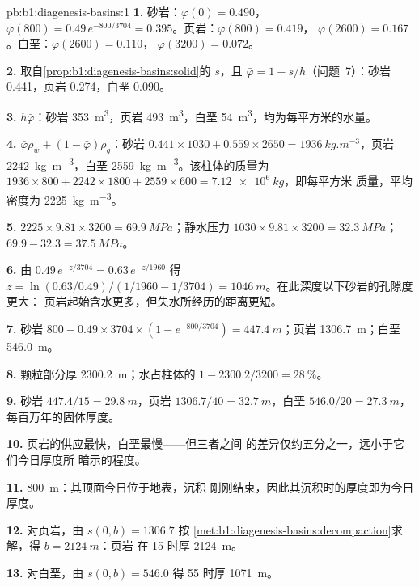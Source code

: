 \begin{solution}{pb:b1:diagenesis-basins:1}
\textbf{1.} 砂岩：$\varphi(0) = \num{0.490}$，$\varphi(800) =
0.49\,e^{-800/3704} = \num{0.395}$。页岩：$\varphi(800) = \num{0.419}$，
$\varphi(2600) = \num{0.167}$。白垩：$\varphi(2600) = \num{0.110}$，
$\varphi(3200) = \num{0.072}$。

\textbf{2.} 取自\cref{prop:b1:diagenesis-basins:solid}的 $s$，且 $\bar\varphi
= 1 - s/h$（问题~7）：砂岩 \num{0.441}，页岩 \num{0.274}，白垩
\num{0.090}。

\textbf{3.} $h\bar\varphi$：砂岩 \qty{353}{m^3}，页岩 \qty{493}{m^3}，白垩
\qty{54}{m^3}，均为每平方米的水量。

\textbf{4.} $\bar\varphi\rho_w + (1 - \bar\varphi)\rho_g$：砂岩
$0.441\times1030 + 0.559\times2650 = \qty{1936}{kg.m^{-3}}$，页岩
\qty{2242}{kg.m^{-3}}，白垩 \qty{2559}{kg.m^{-3}}。该柱体的质量为
$1936\times800 + 2242\times1800 + 2559\times600 = \qty{7.12e6}{kg}$，即每平方米
质量，平均密度为 \qty{2225}{kg.m^{-3}}。

\textbf{5.}  $2225\times9.81\times3200 = \qty{69.9}{MPa}$；静水压力
$1030\times9.81\times3200 = \qty{32.3}{MPa}$；
$69.9 - 32.3 = \qty{37.5}{MPa}$。

\textbf{6.} 由 $0.49\,e^{-z/3704} = 0.63\,e^{-z/1960}$ 得 $z = \ln(0.63/0.49)
/(1/1960 - 1/3704) = \qty{1046}{m}$。在此深度以下砂岩的孔隙度更大：
页岩起始含水更多，但失水所经历的距离更短。

\textbf{7.} 砂岩 $800 - 0.49\times3704\times(1 - e^{-800/3704}) =
\qty{447.4}{m}$；页岩 \qty{1306.7}{m}；白垩 \qty{546.0}{m}。

\textbf{8.} 颗粒部分厚 \qty{2300.2}{m}；水占柱体的 $1 - 2300.2/3200 =
\qty{28}{\%}$。

\textbf{9.} 砂岩 $447.4/15 = \qty{29.8}{m}$，页岩 $1306.7/40 =
\qty{32.7}{m}$，白垩 $546.0/20 = \qty{27.3}{m}$，每百万年的固体厚度。

\textbf{10.} 页岩的供应最快，白垩最慢——但三者之间
的差异仅约五分之一，远小于它们今日厚度所
暗示的程度。

\textbf{11.} \qty{800}{m}：其顶面今日位于地表，沉积
刚刚结束，因此其沉积时的厚度即为今日厚度。

\textbf{12.} 对页岩，由 $s(0, b) = 1306.7$ 按
\cref{met:b1:diagenesis-basins:decompaction}求解，得 $b = \qty{2124}{m}$：页岩
在 \qty{15}{\Ma} 时厚 \qty{2124}{m}。

\textbf{13.} 对白垩，由 $s(0, b) = 546.0$ 得
\qty{55}{\Ma} 时厚 \qty{1071}{m}。


\end{solution}
